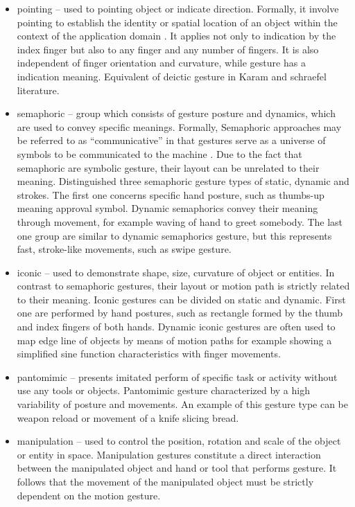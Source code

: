 \begin{itemize}
\item pointing -- used to pointing object or indicate direction. Formally, it involve pointing to establish the identity or spatial location of an object within the context of the application domain \cite{Karam05ataxonomy}. It applies not only to indication by the index finger but also to any finger and any number of fingers. It is also independent of finger orientation and curvature, while gesture has a indication meaning. Equivalent of deictic gesture in Karam and schraefel literature.
\item semaphoric -- group which consists of gesture posture and dynamics, which are used to convey specific meanings. Formally, Semaphoric approaches may be referred to as ``communicative'' in that gestures serve as a universe of symbols to be communicated to the machine \cite{Quek:2002:MHD:568513.568514}. Due to the fact that semaphoric are symbolic gesture, their layout can be unrelated to their meaning. Distinguished three semaphoric gesture types of static, dynamic and strokes. The first one concerns specific hand posture, such as thumbs-up meaning approval symbol.
Dynamic semaphorics convey their meaning through movement, for example waving of hand to greet somebody. The last one group are similar to dynamic semaphorics gesture, but this represents fast, stroke-like movements, such as swipe gesture.
\item iconic -- used to demonstrate shape, size, curvature of object or entities. In contrast to semaphoric gestures, their layout or motion path is strictly related to their meaning. Iconic gestures can be divided on static and dynamic. First one are performed by hand postures, such as rectangle formed by the thumb and index fingers of both hands. Dynamic iconic gestures are often used to map edge line of objects by means of motion paths for example showing a simplified sine function characteristics with finger movements.
\item pantomimic -- presents imitated perform of specific task or activity without use any tools or objects. Pantomimic gesture characterized by a high variability of posture and movements. An example of this gesture type can be weapon reload or movement of a knife slicing bread.
\item manipulation -- used to control the position, rotation and scale of the object or entity in space. Manipulation gestures constitute a direct interaction between the manipulated object and hand or tool that performs gesture. It follows that the movement of the manipulated object must be strictly dependent on the motion gesture.
\end{itemize}

